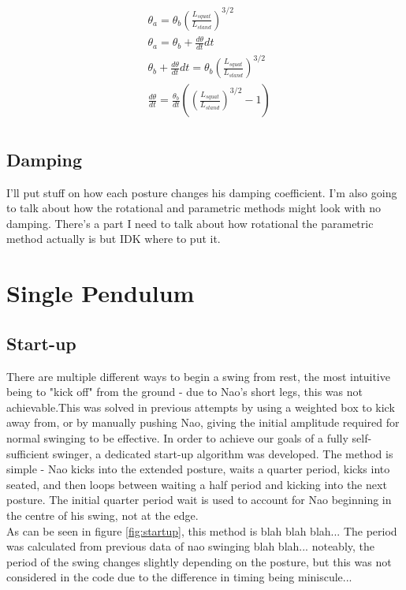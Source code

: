 \documentclass[11pt]{article}
\newcommand*\ruleline[1]{\par\noindent\raisebox{.8ex}{\makebox[\linewidth]{\hrulefill\hspace{1ex}\raisebox{-.8ex}{#1}\hspace{1ex}\hrulefill}}}
\begin{document}
\begin{align}
    &\theta_a = \theta_b (\frac{L_{squat}}{L_{stand}})^{3/2}\\
    &\theta_a = \theta_b + \frac{d\theta}{dt}dt\\
    &\theta_b + \frac{d\theta}{dt}dt = \theta_b (\frac{L_{squat}}{L_{stand}})^{3/2}\\
    &\frac{d\theta}{dt} = \frac{\theta_b}{dt} ((\frac{L_{squat}}{L_{stand}})^{3/2} - 1)\\ 
\end{align}


\subsection{Damping}
\ruleline{James Doering}
I'll put stuff on how each posture changes his damping coefficient.
I'm also going to talk about how the rotational and parametric methods might look with no damping.
There's a part I need to talk about how rotational the parametric method actually is but IDK where to put it.


\section{Single Pendulum}
\subsection{Start-up}
\ruleline{James Doering}
There are multiple different ways to begin a swing from rest, the most intuitive being to "kick off" from the ground - due to Nao's short legs, this was not achievable.This was solved in previous attempts by using a weighted box to kick away from, or by manually pushing Nao, giving the initial amplitude required for normal swinging to be effective. In order to achieve our goals of a fully self-sufficient swinger, a dedicated start-up algorithm was developed. The method is simple - Nao kicks into the extended posture, waits a quarter period, kicks into seated, and then loops between waiting a half period and kicking into the next posture. The initial quarter period wait is used to account for Nao beginning in the centre of his swing, not at the edge. \\

As can be seen in figure \ref{fig:startup}, this method is blah blah blah... The period was calculated from previous data of nao swinging blah blah... noteably, the period of the swing changes slightly depending on the posture, but this was not considered in the code due to the difference in timing being miniscule... \\
\end{document}
